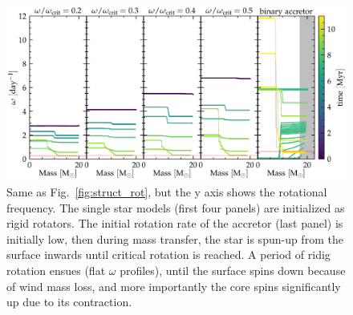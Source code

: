 \documentclass[twocolumn,twocolappendix,trackchanges]{aastex63}
\DeclareRobustCommand{\Figref}[1]{Fig.~\ref{#1}}
\begin{document}
\begin{figure}[htbp]
  \centering
  \includegraphics[width=\textwidth]{omega_struct}
  \caption{Same as \Figref{fig:struct_rot}, but the y axis shows the
    rotational frequency. The single star models (first four panels)
    are initialized as rigid rotators. The initial rotation rate of
    the accretor (last panel) is initially low, then during mass
    transfer, the star is spun-up from the surface inwards until
    critical rotation is reached. A period of ridig rotation ensues
    (flat $\omega$ profiles), until the surface spins down because of
    wind mass loss, and more importantly the core spins significantly
    up due to its contraction. }
  \label{fig:omega}
\end{figure}



\newpage


\end{document}
